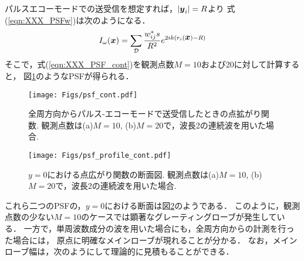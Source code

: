 パルスエコーモードでの送受信を想定すれば，$|\mbox{\boldmath $y$}_i|=R$より
式(\ref{eqn:XXX_PSFw})は次のようになる．
\begin{equation}
	I_\omega(\mbox{\boldmath $x$})
		=
	\sum_{\cal D} 
	\frac{w_{ij}^*s}{R^2}
	e^{
	2ik
	\left(
		r_i(\mbox{\boldmath $x$})-R
	\right)
	}
	\label{eqn:XXX_PSF_cont}
\end{equation}
そこで，式(\ref{eqn:XXX_PSF_cont})を観測点数$M=10$および20に対して計算すると，
図\ref{fig:XXX_psf_cont}のようなPSFが得られる．
\begin{figure}[h]
	\begin{center}
	\texttt{[image: Figs/psf\_cont.pdf]} 
	\end{center}
	\caption{
	全周方向からパルス-エコーモードで送受信したときの点拡がり関数.
	観測点数は(a)$M=10$, (b)$M=20$で，波長2の連続波を用いた場合.} 
	\label{fig:XXX_psf_cont}
\end{figure}
\begin{figure}[h]
	\begin{center}
	\texttt{[image: Figs/psf\_profile\_cont.pdf]} 
	\end{center}
	\caption{$y=0$における点広がり関数の断面図. 
	観測点数は(a)$M=10$, (b)$M=20$で，波長2の連続波を用いた場合.}
	\label{fig:XXX_psf_profile_cont}
\end{figure}
これら二つのPSFの，$y=0$における断面は図\ref{fig:XXX_psf_profile_cont}のようである．
このように，観測点数の少ない$M=10$のケースでは顕著なグレーティングローブが発生している．
一方で，単周波数成分の波を用いた場合にも，全周方向からの計測を行った場合には，
原点に明確なメインローブが現れることが分かる．
なお，メインローブ幅は，次のようにして理論的に見積もることができる．

